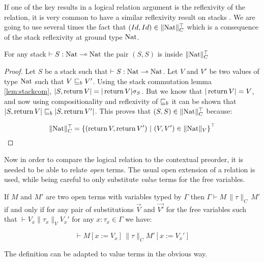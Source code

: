 If one of the key results in 
a logical relation argument is the reflexivity of the relation, 
it is very common to have a similar reflexivity result on stacks \cite{Pitts2000}.
We are going to use several times the fact that $(Id,Id) \in \| \textnormal{Nat} \|_C^\top$
which is a consequence of the stack reflexivity at ground type $\textnormal{Nat}$.

\begin{alemma}
    \label{lem:stackrefl}
    For any stack $\vdash S : \textnormal{Nat} \multimap \textnormal{Nat}$ the pair $(S,S)$ is inside $\| \textnormal{Nat} \|_C^\top$
\end{alemma}

\begin{proof}
    Let $S$ be a stack such that $\vdash S : \textnormal{Nat} \multimap \textnormal{Nat}$. Let 
    $V$ and $V'$ be two values of type $\textnormal{Nat}$ such that $V \sqsubseteq_b V'$.
    Using the stack commutation lemma \ref{lem:stackcom}, $|S, \operatorname{return} V| = |\operatorname{return}
    V| \sigma_S$. But we know that $|\operatorname{return} V| = V$, and now using
    compositionality and reflexivity of $\sqsubseteq_b$ it can be shown 
    that $|S, \operatorname{return} V| \sqsubseteq_b |S, \operatorname{return} V'|$. This proves that $(S,S) \in \| \textnormal{Nat}
    \|_C^\top$ because:

    \begin{equation*}
        \| \textnormal{Nat} \|_C^\top = \left\{ (\operatorname{return} V, \operatorname{return} V') ~|~ (V,V') \in \| \textnormal{Nat} \|_V
        \right\}^\top
    \end{equation*}
\end{proof}

Now in order to compare the logical relation to the contextual preorder,
it is needed to be able to relate \emph{open} terms. The usual 
open extension of a relation is used, while being careful to only 
substitute \emph{value} terms for the free variables.

\begin{adefinition}
    If $M$ and $M'$ are two open terms with variables 
    typed by $\Gamma$ then $\Gamma \vdash M \, \| \tau \|_C \, M'$ if 
    and only if for any pair of substitutions $\vec{V}$ and $\vec{V'}$
    for the free variables such that $\vdash V_x \| \tau_x \|_V V_x'$
    for any $x : \tau_x \in \Gamma$ we have:

    \begin{equation*}
        \vdash M[ x := V_x ] \, \| \tau \|_C M' [ x := V_x' ]
    \end{equation*}

    The definition can be adapted to value terms in the obvious way.
\end{adefinition}


